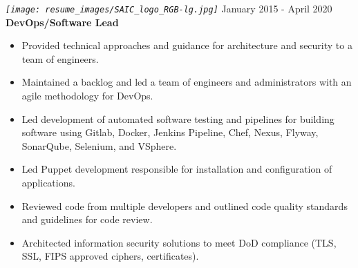 \documentclass[12pt, line, margin]{res}
\begin{document}
\begin{resume}
            {\sl
              \texttt{[image: resume\_images/SAIC\_logo\_RGB-lg.jpg]}
            }
            \hfill January 2015 - April 2020 \\
            \textbf{DevOps/Software Lead}
            \begin{itemize}  \itemsep -2pt %
              \item   Provided technical approaches and guidance for architecture \newline
                          and security to a team of engineers.
              \item   Maintained a backlog and led a team of engineers and \newline
                          administrators with an agile methodology for DevOps.
              \item   Led development of automated software testing and pipelines \newline
                          for building software using Gitlab, Docker, Jenkins Pipeline, Chef,
                          Nexus, Flyway, SonarQube, Selenium, and VSphere.
              \item  Led Puppet development responsible for installation and \newline
                          configuration of applications.
              \item  Reviewed code from multiple developers and outlined code quality \newline
                          standards and guidelines for code review.
              \item   Architected information security solutions to meet DoD \newline
                          compliance (TLS, SSL, FIPS approved ciphers, certificates).
            \end{itemize}

            \pagebreak


\end{resume}
\end{document}
